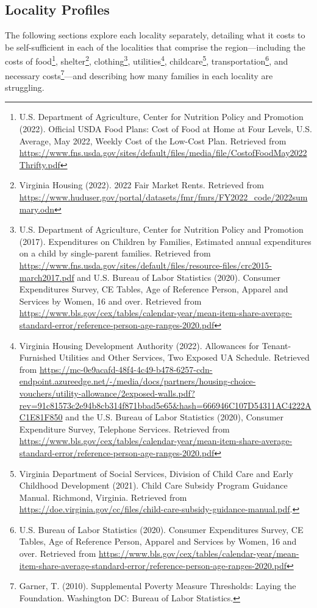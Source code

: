 \documentclass[
]{article}
\begin{document}
\hypertarget{locality-profiles}{%
\subsection{Locality Profiles}\label{locality-profiles}}

The following sections explore each locality separately, detailing what
it costs to be self-sufficient in each of the localities that comprise
the region---including the costs of food\footnote{U.S. Department of
  Agriculture, Center for Nutrition Policy and Promotion (2022).
  Official USDA Food Plans: Cost of Food at Home at Four Levels, U.S.
  Average, May 2022, Weekly Cost of the Low-Cost Plan. Retrieved from
  \url{https://www.fns.usda.gov/sites/default/files/media/file/CostofFoodMay2022Thrifty.pdf}},
shelter\footnote{Virginia Housing (2022). 2022 Fair Market Rents.
  Retrieved from
  \url{https://www.huduser.gov/portal/datasets/fmr/fmrs/FY2022_code/2022summary.odn}},
clothing\footnote{U.S. Department of Agriculture, Center for Nutrition
  Policy and Promotion (2017). Expenditures on Children by Families,
  Estimated annual expenditures on a child by single-parent families.
  Retrieved from
  \url{https://www.fns.usda.gov/sites/default/files/resource-files/crc2015-march2017.pdf}
  and U.S. Bureau of Labor Statistics (2020). Consumer Expenditures
  Survey, CE Tables, Age of Reference Person, Apparel and Services by
  Women, 16 and over. Retrieved from
  \url{https://www.bls.gov/cex/tables/calendar-year/mean-item-share-average-standard-error/reference-person-age-ranges-2020.pdf}},
utilities\footnote{Virginia Housing Development Authority (2022).
  Allowances for Tenant-Furnished Utilities and Other Services, Two
  Exposed UA Schedule. Retrieved from
  \url{https://mc-0e9acafd-48f4-4c49-b478-6257-cdn-endpoint.azureedge.net/-/media/docs/partners/housing-choice-vouchers/utility-allowance/2exposed-walls.pdf?rev=91c81573c2e94b8cb314f871bbad5e65\&hash=666946C107D54311AC4222AC1E81F850}
  and the U.S. Bureau of Labor Statistics (2020), Consumer Expenditure
  Survey, Telephone Services. Retrieved from
  \url{https://www.bls.gov/cex/tables/calendar-year/mean-item-share-average-standard-error/reference-person-age-ranges-2020.pdf}},
childcare\footnote{Virginia Department of Social Services, Division of
  Child Care and Early Childhood Development (2021). Child Care Subsidy
  Program Guidance Manual. Richmond, Virginia. Retrieved from
  \url{https://doe.virginia.gov/cc/files/child-care-subsidy-guidance-manual.pdf}.},
transportation\footnote{U.S. Bureau of Labor Statistics (2020). Consumer
  Expenditures Survey, CE Tables, Age of Reference Person, Apparel and
  Services by Women, 16 and over. Retrieved from
  \url{https://www.bls.gov/cex/tables/calendar-year/mean-item-share-average-standard-error/reference-person-age-ranges-2020.pdf}},
and necessary costs\footnote{Garner, T. (2010). Supplemental Poverty
  Measure Thresholds: Laying the Foundation. Washington DC: Bureau of
  Labor Statistics.}---and describing how many families in each locality
are struggling.
\end{document}
